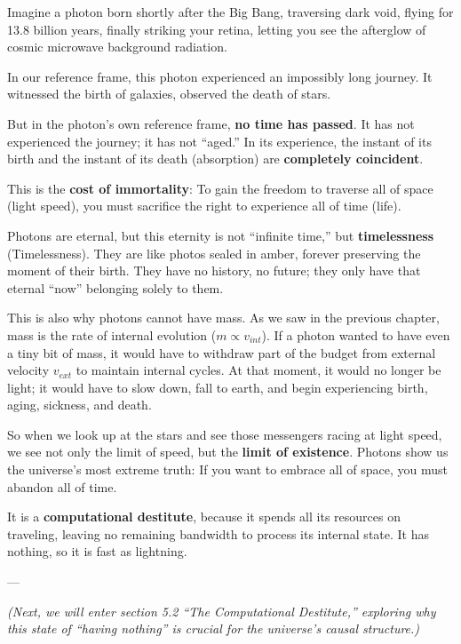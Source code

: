 Imagine a photon born shortly after the Big Bang, traversing dark void, flying for 13.8 billion years, finally striking your retina, letting you see the afterglow of cosmic microwave background radiation.

In our reference frame, this photon experienced an impossibly long journey. It witnessed the birth of galaxies, observed the death of stars.

But in the photon's own reference frame, \textbf{no time has passed}. It has not experienced the journey; it has not ``aged.'' In its experience, the instant of its birth and the instant of its death (absorption) are \textbf{completely coincident}.

This is the \textbf{cost of immortality}: To gain the freedom to traverse all of space (light speed), you must sacrifice the right to experience all of time (life).

Photons are eternal, but this eternity is not ``infinite time,'' but \textbf{timelessness} (Timelessness). They are like photos sealed in amber, forever preserving the moment of their birth. They have no history, no future; they only have that eternal ``now'' belonging solely to them.

This is also why photons cannot have mass. As we saw in the previous chapter, mass is the rate of internal evolution ($m \propto v_{int}$). If a photon wanted to have even a tiny bit of mass, it would have to withdraw part of the budget from external velocity $v_{ext}$ to maintain internal cycles. At that moment, it would no longer be light; it would have to slow down, fall to earth, and begin experiencing birth, aging, sickness, and death.

So when we look up at the stars and see those messengers racing at light speed, we see not only the limit of speed, but the \textbf{limit of existence}. Photons show us the universe's most extreme truth: If you want to embrace all of space, you must abandon all of time.

It is a \textbf{computational destitute}, because it spends all its resources on traveling, leaving no remaining bandwidth to process its internal state. It has nothing, so it is fast as lightning.

---

\textit{(Next, we will enter section 5.2 ``The Computational Destitute,'' exploring why this state of ``having nothing'' is crucial for the universe's causal structure.)}

